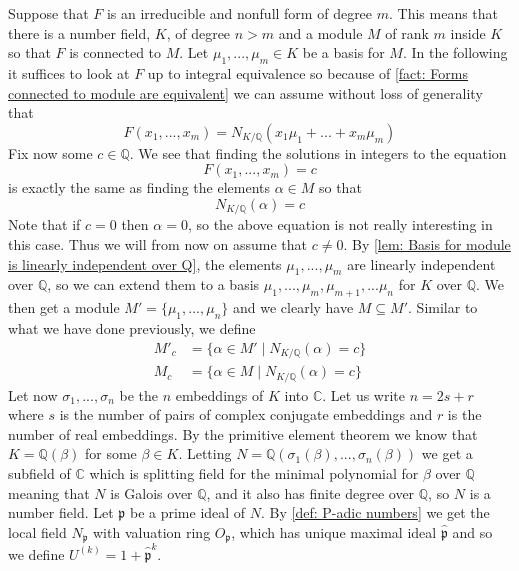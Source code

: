 \documentclass{article}
\newcommand{\mfrak}[1]{\mathfrak{#1}}
\newcommand{\mbb}[1]{\mathbb{#1}}
\numberwithin{equation}{section}
\begin{document}
Suppose that $F$ is an irreducible and nonfull form of degree $m$. This means that there is a number field, $K$, of degree $n > m$ and a module $M$ of rank $m$ inside $K$ so that $F$ is connected to $M$. Let $\mu_1, ..., \mu_m \in K$ be a basis for $M$. In the following it suffices to look at $F$ up to integral equivalence so because of \cref{fact: Forms connected to module are equivalent} we can assume without loss of generality that
\begin{equation*}
	F(x_1, ..., x_m) = N_{K / \mbb Q}(x_1 \mu_1 + ... + x_m \mu_m)
\end{equation*}
Fix now some $c \in \mbb Q$. We see that finding the solutions in integers to the equation
\begin{equation}\label{eq: Initial equation of interest}
	F(x_1, ..., x_m) = c
\end{equation}
is exactly the same as finding the elements $\alpha \in M$ so that
\begin{equation}
	N_{K / \mbb Q}(\alpha) = c
\end{equation}
Note that if $c = 0$ then $\alpha = 0$, so the above equation is not really interesting in this case. Thus we will from now on assume that $c \neq 0$. By \cref{lem: Basis for module is linearly independent over Q}, the elements $\mu_1, ..., \mu_m$ are linearly independent over $\mbb Q$, so we can extend them to a basis $\mu_1, ...,\mu_{m}, \mu_{m+1}, ... \mu_n$ for $K$ over $\mbb Q$. We then get a module $M' = \{ \mu_1, ..., \mu_n\}$ and we clearly have $M \subseteq M'$. Similar to what we have done previously, we define
\begin{align*}
	M'_c & = \{\alpha \in M' \mid N_{K / \mbb Q}(\alpha) = c \} \\
	M_c  & = \{\alpha \in M \mid N_{K / \mbb Q}(\alpha) = c \}
\end{align*}
Let now $\sigma_1, ..., \sigma_n$ be the $n$ embeddings of $K$ into $\mbb C$. Let us write $n = 2s + r$ where $s$ is the number of pairs of complex conjugate embeddings and $r$ is the number of real embeddings. By the primitive element theorem we know that $K = \mbb Q(\beta)$ for some $\beta \in K$. Letting $N = \mbb Q(\sigma_1(\beta), ..., \sigma_n(\beta))$ we get a subfield of $\mbb C$ which is splitting field for the minimal polynomial for $\beta$ over $\mbb Q$ meaning that $N$ is Galois over $\mbb Q$, and it also has finite degree over $\mbb Q$, so $N$ is a number field. Let $\mfrak p$ be a prime ideal of $N$. By \cref{def: P-adic numbers} we get the local field $N_{\mfrak p}$ with valuation ring $O_{\mfrak p}$, which has unique maximal ideal $\hat {\mfrak p}$ and so we define $U^{(k)} = 1 + \hat {\mfrak p}^k$.
\end{document}
